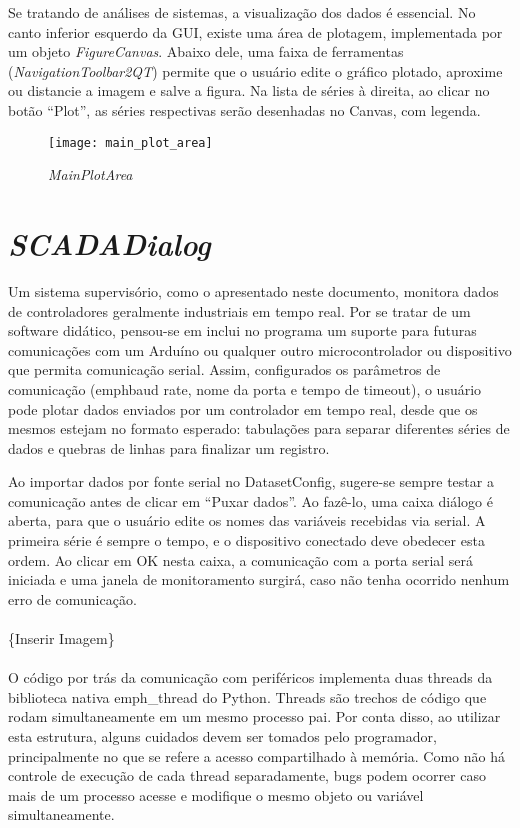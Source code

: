 Se tratando de análises de sistemas, a visualização dos dados é essencial. No canto inferior esquerdo da GUI, existe uma área de plotagem, implementada por um objeto \emph{FigureCanvas}. Abaixo dele, uma faixa de ferramentas (\emph{NavigationToolbar2QT}) permite que o usuário edite o gráfico plotado, aproxime ou distancie a imagem e salve a figura. Na lista de séries à direita, ao clicar no botão “Plot”, as séries respectivas serão desenhadas no Canvas, com legenda.

\begin{figure}[H]
	\centering
	\texttt{[image: main\_plot\_area]}
	\caption{\emph{MainPlotArea}}
	\label{img_main_plot_area}
\end{figure}

\section{\emph{SCADADialog}}

Um sistema supervisório, como o apresentado neste documento, monitora dados de controladores geralmente industriais em tempo real. Por se tratar de um software didático, pensou-se em inclui no programa um suporte para futuras comunicações com um Arduíno ou qualquer outro microcontrolador ou dispositivo que permita comunicação serial. Assim, configurados os parâmetros de comunicação (emph{baud rate}, nome da porta e tempo de timeout), o usuário pode plotar dados enviados por um controlador em tempo real, desde que os mesmos estejam no formato esperado: tabulações para separar diferentes séries de dados e quebras de linhas para finalizar um registro.

Ao importar dados por fonte serial no DatasetConfig, sugere-se sempre testar a comunicação antes de clicar em “Puxar dados”. Ao fazê-lo, uma caixa diálogo é aberta, para que o usuário edite os nomes das variáveis recebidas via serial. A primeira série é sempre o tempo, e o dispositivo conectado deve obedecer esta ordem. Ao clicar em OK nesta caixa, a comunicação com a porta serial será iniciada e uma janela de monitoramento surgirá, caso não tenha ocorrido nenhum erro de comunicação.
\\\\
\{Inserir Imagem\}
\\\\
O código por trás da comunicação com periféricos implementa duas threads da biblioteca nativa emph{\_thread} do Python. Threads são trechos de código que rodam simultaneamente em um mesmo processo pai. Por conta disso, ao utilizar esta estrutura, alguns cuidados devem ser tomados pelo programador, principalmente no que se refere a acesso compartilhado à memória. Como não há controle de execução de cada thread separadamente, bugs podem ocorrer caso mais de um processo acesse e modifique o mesmo objeto ou variável simultaneamente.

